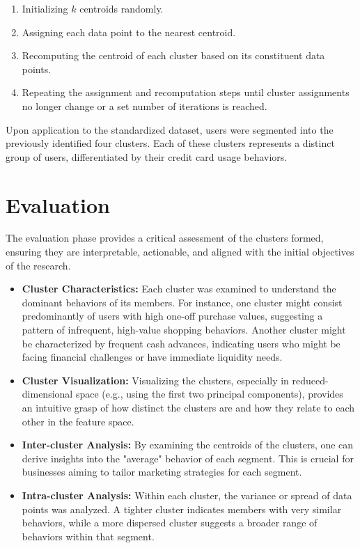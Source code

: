 \documentclass[12pt]{article}
\begin{document}
\begin{enumerate}
    \item Initializing \(k\) centroids randomly.
    \item Assigning each data point to the nearest centroid.
    \item Recomputing the centroid of each cluster based on its constituent data points.
    \item Repeating the assignment and recomputation steps until cluster assignments no longer change or a set number of iterations is reached.
\end{enumerate}

Upon application to the standardized dataset, users were segmented into the previously identified four clusters. Each of these clusters represents a distinct group of users, differentiated by their credit card usage behaviors.

\section{Evaluation}

The evaluation phase provides a critical assessment of the clusters formed, ensuring they are interpretable, actionable, and aligned with the initial objectives of the research.

\begin{itemize}
    \item \textbf{Cluster Characteristics:} Each cluster was examined to understand the dominant behaviors of its members. For instance, one cluster might consist predominantly of users with high one-off purchase values, suggesting a pattern of infrequent, high-value shopping behaviors. Another cluster might be characterized by frequent cash advances, indicating users who might be facing financial challenges or have immediate liquidity needs.

    \item \textbf{Cluster Visualization:} Visualizing the clusters, especially in reduced-dimensional space (e.g., using the first two principal components), provides an intuitive grasp of how distinct the clusters are and how they relate to each other in the feature space.

    \item \textbf{Inter-cluster Analysis:} By examining the centroids of the clusters, one can derive insights into the "average" behavior of each segment. This is crucial for businesses aiming to tailor marketing strategies for each segment.

    \item \textbf{Intra-cluster Analysis:} Within each cluster, the variance or spread of data points was analyzed. A tighter cluster indicates members with very similar behaviors, while a more dispersed cluster suggests a broader range of behaviors within that segment.
\end{itemize}
\end{document}
